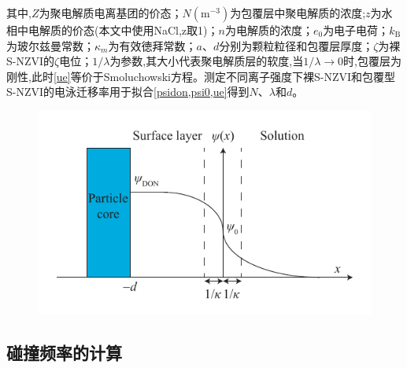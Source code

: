 其中,$Z$为聚电解质电离基团的价态；$N(\mathrm{m^{-3}})$为包覆层中聚电解质的浓度;$z$为水相中电解质的价态(本文中使用NaCl,z取1)；$n$为电解质的浓度；$e_0$为电子电荷；$k_\mathrm{B}$为玻尔兹曼常数；$\kappa_m$为有效徳拜常数；$a$、$d$分别为颗粒粒径和包覆层厚度；$\zeta$为裸S-NZVI的$\zeta$电位；$1/\lambda$为参数,其大小代表聚电解质层的软度,当$1/\lambda\rightarrow 0$时,包覆层为刚性,此时\cref{ue}等价于Smoluchowski方程。测定不同离子强度下裸S-NZVI和包覆型S-NZVI的电泳迁移率用于拟合\cref{psidon,psi0,ue}得到$N$、$\lambda$和$d$。

\begin{figure}
    \centering
    \includegraphics[width=12cm]{figs/Donnan-potential.pdf}
    \label{donnan}
\end{figure}

\subsection{碰撞频率的计算}

